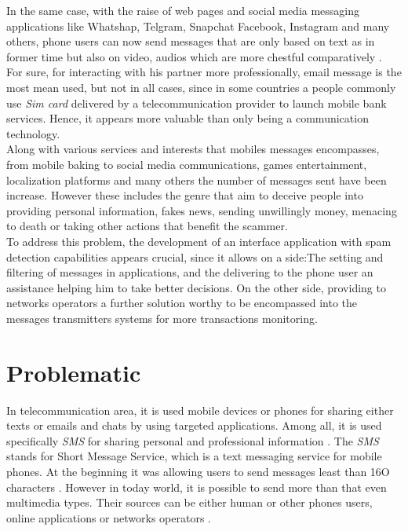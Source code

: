 \documentclass[12pt,a4paper, oneside]{book}
\begin{document}
	In the same case, with the raise of web pages and social media messaging applications like Whatshap, Telgram, Snapchat Facebook, Instagram and many others, phone users can now send messages  that are only based on text as in former time but also on video, audios which are more chestful comparatively \cite{faklaris2016oh}. \\
	
	For sure, for interacting with his partner more professionally, email message is the most mean used, but not in all cases, since in some countries a  people commonly use \textit{Sim card} delivered by a telecommunication provider to launch mobile bank services. Hence, it appears more valuable than only being a communication technology.\\
	
	Along with various services and interests that mobiles messages encompasses, from mobile baking to social media communications, games entertainment, localization platforms and many others the number of messages sent have been increase. However these includes the genre that aim to deceive people into providing personal information, fakes news, sending unwillingly money, menacing to death or taking other actions that benefit the scammer.\\
		
	To address this problem, the development of an interface application with spam detection capabilities appears crucial, since it allows on a side:The setting and filtering of messages in applications, and the delivering to the phone user an assistance helping him to take better decisions. On the other side, providing to networks operators a further solution worthy to be encompassed into the messages transmitters systems for more transactions monitoring.
	 
	\section{Problematic} 
	In telecommunication area, it is used mobile devices or phones for sharing either texts or emails and chats by using targeted applications. Among all, it is used specifically \textit{SMS} for sharing personal and professional information  \cite{lavanya2582sms}. The \textit{SMS} stands for Short Message Service, which is a text messaging service for mobile phones. At the beginning it was allowing users to send messages  least than 16O characters \cite{le2005mobile}. However in today world, it is possible to send more than that even multimedia types. Their sources can be either human or other phones users, online applications or networks operators \cite{jangir2016design}.\\
		
\end{document}
